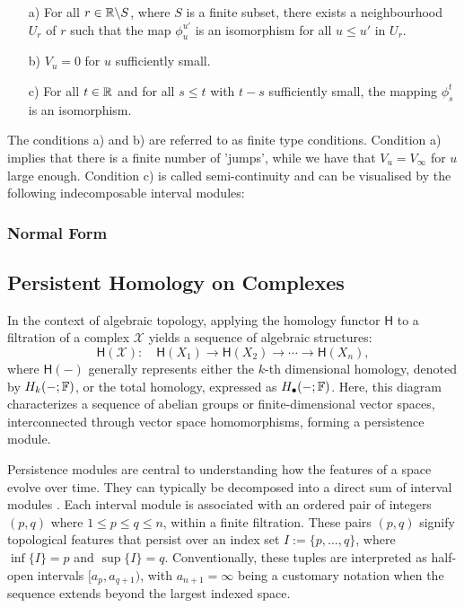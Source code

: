 \begin{itemize}
	\item[a)] For all $r \in {\mathbb{R}}\backslash S$, where $S$ is a finite subset, there exists a neighbourhood $U_r$ of $r$ such that the map $\phi_u^{u'}$ is an isomorphism for all $u \leq u'$ in $U_r$.
	\item[b)] $V_u = 0$ for $u$ sufficiently small.
	\item[c)] For all $t \in {\mathbb{R}}$ and for all $s \leq t$ with $t-s$ sufficiently small, the mapping $\phi_s^t$ is an isomorphism.
\end{itemize}

The conditions a) and b) are referred to as finite type conditions. Condition a) implies that there is a finite number of 'jumps', while we have that $V_u = V_\infty$ for $u$ large enough. Condition c) is called semi-continuity and can be visualised by the following indecomposable interval modules:

\subsubsection{Normal Form}
\label{normalform}

\subsection{Persistent Homology on Complexes}
\label{PersistentHomologyonComplexes}
In the context of algebraic topology, applying the homology functor $\mathsf{H}$
to a filtration of a complex $\mathcal{X}$ yields a sequence of algebraic structures:
\begin{equation}
	\mathsf{H}(\mathcal{X}): \quad \mathsf{H}(X_{1}) \to \mathsf{H}(X_{2}) \to \cdots
	\to \mathsf{H}(X_{n}),
\end{equation}
where $\mathsf{H}(-)$ generally represents either the $k$-th dimensional
homology, denoted by $H_{k}(-;{\mathbb{F}})$, or the total homology, expressed as $H
_{\bullet}(-;{\mathbb{F}})$. Here, this diagram characterizes a sequence of abelian
groups or finite-dimensional vector spaces, interconnected through vector space
homomorphisms, forming a persistence module.

Persistence modules are central to understanding how the features of a space evolve
over time. They can typically be decomposed into a direct sum of interval
modules \cite[\S 8]{EdelsbrunnerHarer2010}. Each interval module is associated with an
ordered pair of integers $(p,q)$ where $1 \leq p \leq q \leq n$, within a finite
filtration. These pairs $(p,q)$ signify topological features that persist over an
index set $I := \{p, \ldots, q\}$, where $\inf\{I\} = p$ and $\sup\{I\} = q$. Conventionally,
these tuples are interpreted as half-open intervals $[a_{p}, a_{q+1})$, with $a_{n+1}
= \infty$ being a customary notation when the sequence extends beyond the largest
indexed space.

